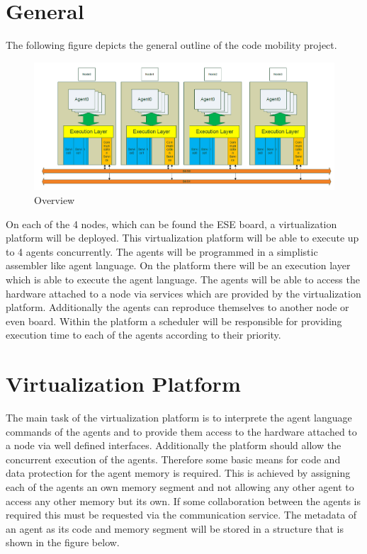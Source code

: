 \documentclass{scrreprt}
\begin{document}
\section{General}

The following figure depicts the general outline of the code mobility project.

\begin{figure}[!htbp]
\includegraphics[scale=0.4]{figures/global.png}
\caption{Overview}
\end{figure}

On each of the 4 nodes, which can be found the ESE board, a virtualization platform will be deployed. 
This virtualization platform will be able to execute up to 4 agents concurrently. The agents will be 
programmed in a simplistic assembler like agent language. On the platform there will be an execution 
layer which is able to execute the agent language. The agents will be able to access the hardware attached
to a node via services which are provided by the virtualization platform. Additionally the agents can
reproduce themselves to another node or even board. Within the platform a scheduler will be responsible for
providing execution time to each of the agents according to their priority. 

\section{Virtualization Platform}
The main task of the virtualization platform is to interprete the agent language commands of the agents 
and to provide them access to the hardware attached to a node via well defined interfaces. Additionally 
the platform should allow the concurrent execution of the agents. Therefore some basic means for code and 
data protection for the agent memory is required. This is achieved by assigning each of the agents an own 
memory segment and not allowing any other agent to access any other memory but its own. If some collaboration 
between the agents is required this must be requested via the communication service. The metadata of an agent 
as its code and memory segment will be stored in a structure that is shown in the figure below. \newline
\end{document}

